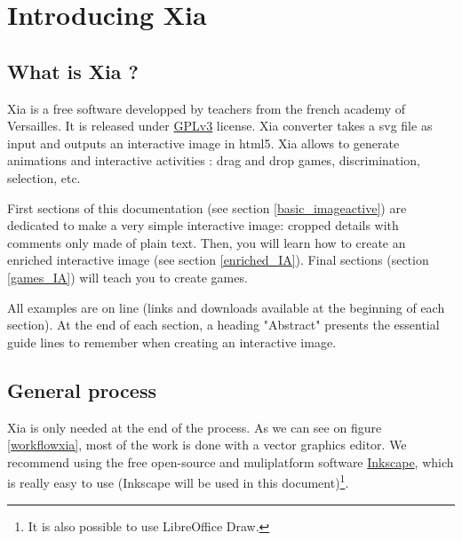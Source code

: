




 \maketitle
 \tableofcontents
  
  \renewcommand{\figurename}{Figure}
  \renewcommand{\tablename}{Table}
  \renewcommand{\listfigurename}{List of figures}
  
  
\section{Introducing Xia}

\subsection{What is Xia ?}

Xia is a free software developped by teachers from the french academy of Versailles.
It is released under \href{http://www.gnu.org/copyleft/gpl.html}{GPLv3} license.
Xia converter takes a svg file as input and outputs an interactive image in 
html5. Xia allows to generate animations and interactive activities : 
drag and drop games, discrimination, selection, etc.

First sections of this documentation (see section \ref{basic_imageactive}) are dedicated to make a very simple 
interactive image: cropped details with comments only made of plain text.
Then, you will learn how to create an enriched interactive image (see section \ref{enriched_IA}). Final sections (section \ref{games_IA}) will teach you to create games.

\begin{astuce}
All examples are on line (links and downloads available at 
the beginning of each section). At the end
of each section, a heading "Abstract" presents the essential guide lines to 
remember when creating an interactive image. 
\end{astuce}

\subsection{General process}

Xia is only needed at the end of the process.
As we can see on figure \ref{workflowxia}, most of the work is done with 
a  vector graphics editor. We recommend using the free open-source and 
muliplatform software \href{http://www.inkscape.org/}{Inkscape}, which is 
really easy to use (Inkscape will be used in this document)\footnote{It is also possible 
to use LibreOffice Draw.}.

